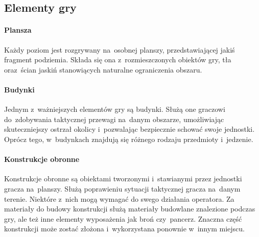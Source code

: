 \documentclass[licencjacka]{pracamgr}
\begin{document}
    \subsection{Elementy gry}
      \paragraph{Plansza}
	      Każdy poziom jest rozgrywany na~osobnej planszy, przedstawiającej jakiś fragment podziemia. Składa się ona
      	z~rozmieszczonych obiektów gry, tła oraz~ścian jaskiń stanowiących naturalne ograniczenia obszaru.
      \paragraph{Budynki}
      	Jednym z~ważniejszych elementów gry są budynki. Służą one graczowi do~zdobywania taktycznej przewagi na~danym
      	obszarze, umożliwiając skuteczniejszy ostrzał okolicy i~pozwalając bezpiecznie schować swoje jednostki. Oprócz
      	tego, w~budynkach	znajdują się różnego rodzaju przedmioty i~jedzenie.
      \paragraph{Konstrukcje obronne}
       	Konstrukcje obronne są obiektami tworzonymi i~stawianymi przez jednostki gracza na~planszy. Służą poprawieniu
       	sytuacji taktycznej gracza na~danym terenie. Niektóre z~nich mogą wymagać do swego działania operatora. Za
       	materiały do budowy konstrukcji służą materiały budowlane znalezione podczas gry, ale też inne elementy wyposażenia
       	jak broń czy~pancerz.	Znaczna część konstrukcji może zostać złożona i~wykorzystana ponownie w~innym miejscu.
\end{document}
